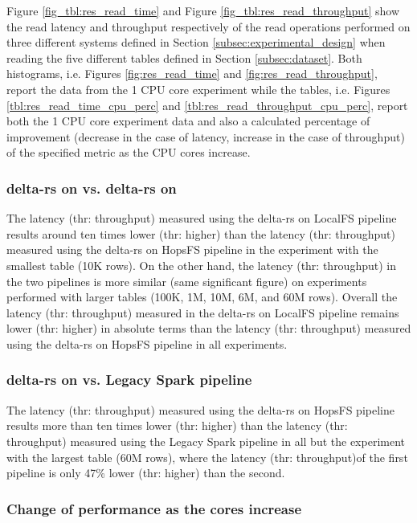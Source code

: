 Figure \ref{fig_tbl:res_read_time} and Figure \ref{fig_tbl:res_read_throughput} show the read latency and throughput respectively of the read operations performed on three different systems defined in Section \ref{subsec:experimental_design} when reading the five different tables defined in Section \ref{subsec:dataset}. Both histograms, i.e. Figures \ref{fig:res_read_time} and \ref{fig:res_read_throughput}, report the data from the 1 \gls{CPU} core experiment while the tables, i.e. Figures \ref{tbl:res_read_time_cpu_perc} and \ref{tbl:res_read_throughput_cpu_perc}, report both the 1 \gls{CPU} core experiment data and also a calculated percentage of improvement (decrease in the case of latency, increase in the case of throughput) of the specified metric as the \gls{CPU} cores increase.

\subsubsection*{delta-rs on  vs. delta-rs on }

The latency (thr: throughput) measured using the delta-rs on \gls{LocalFS} pipeline results around ten times lower (thr: higher) than the latency (thr: throughput) measured using the delta-rs on \gls{HopsFS} pipeline in the experiment with the smallest table (10K rows). On the other hand, the latency (thr: throughput) in the two pipelines is more similar (same significant figure) on experiments performed with larger tables (100K, 1M, 10M, 6M, and 60M rows). Overall the latency (thr: throughput) measured in the delta-rs on \gls{LocalFS} pipeline remains lower (thr: higher) in absolute terms than the latency (thr: throughput) measured using the delta-rs on \gls{HopsFS} pipeline in all experiments.

\subsubsection*{delta-rs on  vs. Legacy Spark pipeline}

The latency (thr: throughput) measured using the delta-rs on \gls{HopsFS} pipeline results more than ten times lower (thr: higher) than the latency (thr: throughput) measured using the Legacy Spark pipeline in all but the experiment with the largest table (60M rows), where the latency (thr: throughput)of the first pipeline is only 47\% lower (thr: higher) than the second. 

\subsubsection*{Change of performance as the  cores increase}

